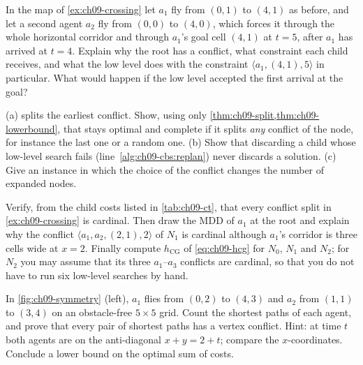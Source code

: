 \begin{exercise}[\difficulty{1}]
\label{exr:ch09-goalstay}
In the map of \cref{ex:ch09-crossing} let $a_1$ fly from $(0,1)$ to
$(4,1)$ as before, and let a second agent $a_2$ fly from $(0,0)$ to $(4,0)$,
which forces it through the whole horizontal corridor and through $a_1$'s
goal cell $(4,1)$ at $t = 5$, after $a_1$ has arrived at $t = 4$. Explain why
the root has a conflict, what constraint each child receives, and what the
low level does with the constraint $\langle a_1, (4,1), 5\rangle$ in
particular. What would happen if the low level accepted the first arrival
at the goal?
\end{exercise}

\begin{exercise}[\difficulty{2}]
\label{exr:ch09-proof-lb}
(a)  splits the earliest conflict. Show, using only
\cref{thm:ch09-split,thm:ch09-lowerbound}, that \cbs stays optimal and
complete if it splits \emph{any} conflict of the node, for instance the
last one or a random one. (b) Show that discarding a child whose low-level
search fails (line~\ref{alg:ch09-cbs:replan}) never discards a solution.
(c) Give an instance in which the choice of the conflict changes the number
of expanded nodes.
\end{exercise}

\begin{exercise}[\difficulty{2}]
\label{exr:ch09-cardinal}
Verify, from the child costs listed in \cref{tab:ch09-ct}, that every
conflict split in \cref{ex:ch09-crossing} is cardinal. Then draw
the MDD of $a_1$ at the root and explain why the conflict
$\langle a_1, a_2, (2,1), 2\rangle$ of $N_1$ is cardinal although $a_1$'s
corridor is three cells wide at $x = 2$. Finally compute
$h_{\mathrm{CG}}$ of \cref{eq:ch09-hcg} for $N_0$, $N_1$ and $N_2$; for
$N_2$ you may assume that its three $a_1$--$a_3$ conflicts are cardinal,
so that you do not have to run six low-level searches by hand.
\end{exercise}

\begin{exercise}[\difficulty{2}]
\label{exr:ch09-rectangle}
In \cref{fig:ch09-symmetry} (left), $a_1$ flies from $(0,2)$ to $(4,3)$ and
$a_2$ from $(1,1)$ to $(3,4)$ on an obstacle-free $5 \times 5$ grid. Count
the shortest paths of each agent, and prove that every pair of shortest
paths has a vertex conflict. Hint: at time $t$ both agents are on the
anti-diagonal $x + y = 2 + t$; compare the $x$-coordinates. Conclude a lower
bound on the optimal sum of costs.
\end{exercise}

